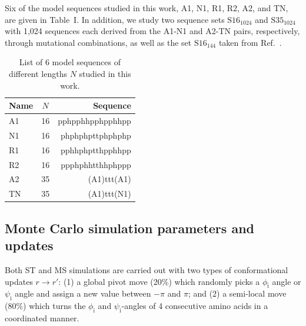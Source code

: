 \documentclass[
aip,
rsi,%
amsmath,amssymb,
reprint,%
]{revtex4-1}
\newcommand	 {\rbar}	{{r}}
\begin{document}
Six of the model sequences studied in this work, A1, N1, R1, R2, A2, and TN, are given in Table~I. In addition, we study two sequence sets $\mathrm{S16}_{1024}$  and $\mathrm{S35}_{1024}$ with 1,024 sequences each derived from the A1-N1 and A2-TN pairs, respectively, through mutational combinations, as well as the set $\mathrm{S16}_{144}$ taken from  Ref.~\protect{}. 
 
\begin{table}
\caption{\label{tab1} List of 6 model sequences of different lengths $N$ studied in this work.}
\begin{ruledtabular}
\begin{tabular}{lcr}
Name & $N$ & Sequence \\
\hline
A1 & 16 & pphpphhpphpphhpp \\
N1 & 16 & phphphpttphphphp \\
R1 & 16 & pphhphptthpphhpp\\
R2 & 16 & ppphphhtthhphppp\\
A2 & 35 & (A1)ttt(A1)\\
TN & 35 & (A1)ttt(N1)\\
\end{tabular}
\end{ruledtabular}
\end{table}


\subsection{Monte Carlo simulation parameters and updates}

Both ST and MS simulations are carried out with two types of conformational updates $\rbar\rightarrow\rbar'$: (1) a global pivot move (20\%) which randomly picks a $\phi_\mathrm{i}$ angle or $\psi_\mathrm{i}$ angle and assign a new value between $-\pi$ and $\pi$; and (2) a semi-local move (80\%) which turns the $\phi_\mathrm{i}$ and $\psi_\mathrm{i}$-angles of 4 consecutive amino acids in a coordinated manner.~\cite{Favrin2001} 

\end{document}

